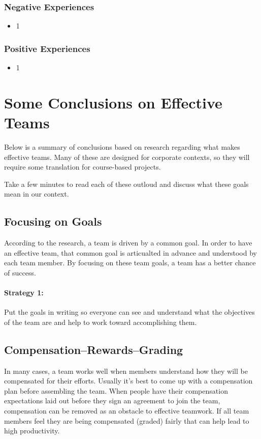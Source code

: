 \documentclass{article}\usepackage[]{graphicx}\usepackage[]{color}
\begin{document}
\subsubsection{Negative Experiences}
\begin{itemize}
\item 1
\end{itemize}

\subsubsection{Positive Experiences}
\begin{itemize}
\item 1
\end{itemize}


\section{Some Conclusions on Effective Teams}

Below is a summary of conclusions based on research regarding what makes effective teams. Many of these are designed for corporate contexts, so they will require some translation for course-based projects.

Take a few minutes to read each of these outloud and discuss what these goals mean in our context.

\subsection{Focusing on Goals}

According to the research, a team is driven by a common goal. In order to have an effective team, that common goal is articualted in advance and understood by each team member. By focusing on these team goals, a team has a better chance of success. 

\paragraph{Strategy 1:} Put the goals in writing so everyone can see and understand what the objectives of the team are and help to work toward accomplishing them.

\subsection{Compensation--Rewards--Grading}

In many cases, a team works well when members understand how they will be compensated for their efforts. Usually it's best to come up with a compensation plan before assembling the team. When people have their compensation expectations laid out before they sign an agreement to join the team, compensation can be removed as an obstacle to effective teamwork. If all team members feel they are being compensated (graded) fairly that can help lead to high productivity.
\end{document}

